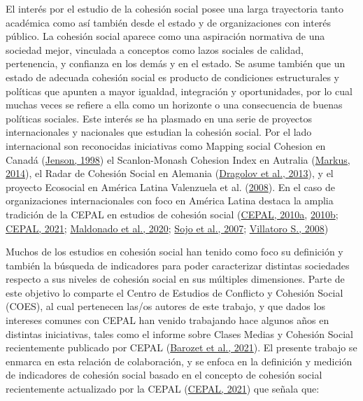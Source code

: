 \documentclass[
  12pt,
]{book}
\begin{document}
El interés por el estudio de la cohesión social posee una larga trayectoria tanto académica como así también desde el estado y de organizaciones con interés público. La cohesión social aparece como una aspiración normativa de una sociedad mejor, vinculada a conceptos como lazos sociales de calidad, pertenencia, y confianza en los demás y en el estado. Se asume también que un estado de adecuada cohesión social es producto de condiciones estructurales y políticas que apunten a mayor igualdad, integración y oportunidades, por lo cual muchas veces se refiere a ella como un horizonte o una consecuencia de buenas políticas sociales. Este interés se ha plasmado en una serie de proyectos internacionales y nacionales que estudian la cohesión social. Por el lado internacional son reconocidas iniciativas como Mapping social Cohesion en Canadá (\protect\hyperlink{ref-jenson_mapping_1998}{Jenson, 1998}) el Scanlon-Monash Cohesion Index en Autralia (\protect\hyperlink{ref-markus_mapping_2014}{Markus, 2014}), el Radar de Cohesión Social en Alemania (\protect\hyperlink{ref-dragolov_social_2013}{Dragolov et al., 2013}), y el proyecto Ecosocial en América Latina Valenzuela et al. (\protect\hyperlink{ref-valenzuela_vinculos_2008}{2008}). En el caso de organizaciones internacionales con foco en América Latina destaca la amplia tradición de la CEPAL en estudios de cohesión social (\protect\hyperlink{ref-cepal_america_2010}{CEPAL, 2010a}, \protect\hyperlink{ref-cepal_cohesion_2010}{2010b}; \protect\hyperlink{ref-cepal_cohesion_2021}{CEPAL, 2021}; \protect\hyperlink{ref-maldonado_inclusion_2020}{Maldonado et al., 2020}; \protect\hyperlink{ref-sojo_cohesion_2007}{Sojo et al., 2007}; \protect\hyperlink{ref-villatoros._sistema_2008}{Villatoro S., 2008})

Muchos de los estudios en cohesión social han tenido como foco su definición y también la búsqueda de indicadores para poder caracterizar distintas sociedades respecto a sus niveles de cohesión social en sus múltiples dimensiones. Parte de este objetivo lo comparte el Centro de Estudios de Conflicto y Cohesión Social (COES), al cual pertenecen las/os autores de este trabajo, y que dados los intereses comunes con CEPAL han venido trabajando hace algunos años en distintas iniciativas, tales como el informe sobre Clases Medias y Cohesión Social recientemente publicado por CEPAL (\protect\hyperlink{ref-barozet_clases_2021}{Barozet et al., 2021}). El presente trabajo se enmarca en esta relación de colaboración, y se enfoca en la definición y medición de indicadores de cohesión social basado en el concepto de cohesión social recientemente actualizado por la CEPAL (\protect\hyperlink{ref-cepal_cohesion_2021}{CEPAL, 2021}) que señala que:
\end{document}
